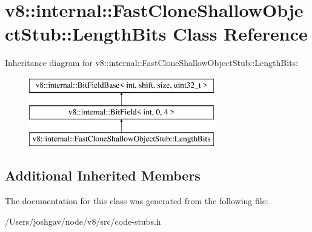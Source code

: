 \hypertarget{classv8_1_1internal_1_1_fast_clone_shallow_object_stub_1_1_length_bits}{}\section{v8\+:\+:internal\+:\+:Fast\+Clone\+Shallow\+Object\+Stub\+:\+:Length\+Bits Class Reference}
\label{classv8_1_1internal_1_1_fast_clone_shallow_object_stub_1_1_length_bits}
Inheritance diagram for v8\+:\+:internal\+:\+:Fast\+Clone\+Shallow\+Object\+Stub\+:\+:Length\+Bits\+:\begin{figure}[H]
\begin{center}
\leavevmode
\includegraphics[height=3.000000cm]{classv8_1_1internal_1_1_fast_clone_shallow_object_stub_1_1_length_bits}
\end{center}
\end{figure}
\subsection*{Additional Inherited Members}


The documentation for this class was generated from the following file\+:\begin{DoxyCompactItemize}
\item 
/\+Users/joshgav/node/v8/src/code-\/stubs.\+h\end{DoxyCompactItemize}
